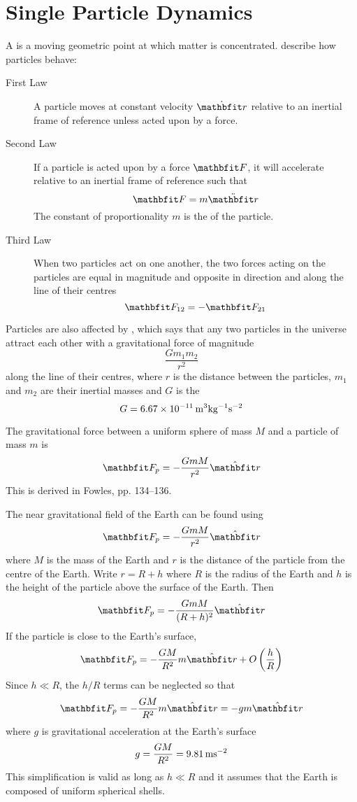 %
%
%
%
%

\chapter{Single Particle Dynamics}
\label{spd chp}

A  is a moving geometric point at which matter is
concentrated.   describe how particles behave:
\begin{description}
\item[First Law] A particle moves at constant velocity $\dot{\vect{r}}$ 
relative to an inertial frame of reference unless acted upon by a force.

\item[Second Law] If a particle is acted upon by a force $\vect{F}$, it will
accelerate relative to an inertial frame of reference such that
$$\vect{F}=m\ddot{\vect{r}}$$
The constant of proportionality $m$ is the  of the
particle.

\item[Third Law] When two particles act on one another, the two forces
acting on the particles are equal in magnitude and opposite in direction and
along the line of their centres
$$\vect{F}_{12}=-\vect{F}_{21}$$
\end{description}

Particles are also affected by ,
which says that any two particles in the universe attract each other with a
gravitational force of magnitude
$$\frac{Gm_1m_2}{r^2}$$
along the line of their centres, where $r$ is the distance between the
particles, $m_1$ and $m_2$ are their inertial masses and $G$ is the
$$G=6.67\times 10^{-11}\rm\,m^3kg^{-1}s^{-2}$$

The gravitational force between a uniform sphere of mass $M$ and a particle
of mass $m$ is
$$\vect{F}_p=-\frac{GmM}{r^2}\rvect$$
This is derived in Fowles, pp. 134--136.

The near gravitational field of the Earth can be found using
$$\vect{F}_p=-\frac{GmM}{r^2}\rvect$$
where $M$ is the mass of the Earth and $r$ is the distance of the particle
from the centre of the Earth.  Write $r=R+h$ where $R$ is the radius of the
Earth and $h$ is the height of the particle above the surface of the Earth. 
Then
$$\vect{F}_p=-\frac{GmM}{(R+h)^2}\rvect$$
If the particle is close to the Earth's surface,
$$\vect{F}_p=-\frac{GM}{R^2}m\rvect + O\left(\frac{h}{R}\right)$$
Since $h\ll R$, the $h/R$ terms can be neglected so that
$$\vect{F}_p=-\frac{GM}{R^2}m\rvect=-gm\rvect$$
where $g$ is gravitational acceleration at the Earth's surface
$$g=\frac{GM}{R^2}=9.81\rm\,ms^{-2}$$
This simplification is valid as long as $h\ll R$ and it assumes that the Earth
is composed of uniform spherical shells.

